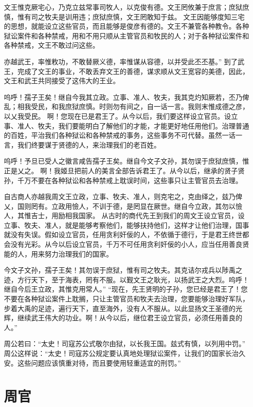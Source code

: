 \documentclass[12pt,UTF8]{ctexbook}
\begin{document}
文王惟克厥宅心，乃克立兹常事司牧人，以克俊有德。文王罔攸兼于庶言；庶狱庶慎，惟有司之牧夫是训用违；庶狱庶慎，文王罔敢知于兹。
文王因能够度知三宅的思想，就能设立这些官员，而且能够是俊彦有德的。文王不兼管各种教令。各种狱讼案件和各种禁戒，用和不用只顺从主管官员和牧民的人；对于各种狱讼案件和各种禁戒，文王不敢过问这些。

亦越武王，率惟敉功，不敢替厥义德，率惟谋从容德，以并受此丕丕基。”
到了武王，完成了文王的事业，不敢丢弃文王的善德，谋求顺从文王宽容的美德，因此，文王和武王共同接受了这伟大的王业。

呜呼！孺子王矣！继自今我其立政。立事、准人、牧夫，我其克灼知厥若，丕乃俾乱；相我受民，和我庶狱庶慎。时则勿有间之，自一话一言。我则末惟成德之彦，以乂我受民。
啊！您现在已是君王了。从今以后，我们要这样设立官员。设立事、准人、牧夫，我们要能明白了解他们的才能，才能更好地任用他们。治理普通的百姓，平治我们各种狱讼和各种禁戒的事务，这些事务不可代替。虽然一话一言，我们终要谋于贤德的人，来治理我们的老百姓。

呜呼！予旦已受人之徽言咸告孺子王矣。继自今文子文孙，其勿误于庶狱庶慎，惟正是乂之。
啊！我姬旦把前人的美言全部告诉君王了。从今以后，继承的贤子贤孙，千万不要在各种狱讼和各种禁戒上耽误时间，这些事只让主管官员去治理。

自古商人亦越我周文王立政，立事、牧夫、准人，则克宅之，克由绎之，兹乃俾乂，国则罔有。立政用憸人，不训于德，是罔显在厥世。继自今立政，其勿以憸人，其惟吉士，用励相我国家。
从古时的商代先王到我们的周文王设立官员，设立事、牧夫、准人，就是能够考察他们，能够扶持他们，这样才让他们治理，国事就没有失误。假如设立官员，任用贪利奸佞的人，不依循于德行，于是君王终世都会没有光彩。从今以后设立官员，千万不可任用贪利奸佞的小人，应当任用善良贤能的人，用来努力治理我们的国家。

今文子文孙，孺子王矣！其勿误于庶狱，惟有司之牧夫。其克诘尔戎兵以陟禹之迹，方行天下，至于海表，罔有不服。以觐文王之耿光，以扬武王之大烈。呜呼！继自今后王立政，其惟克用常人。”
“现在，先王贤明的子孙，您已经是君王了！您不要在各种狱讼案件上耽搁，只让主管官员和牧夫去治理，您要能够治理好军队，步着大禹的足迹，遍行天下，直至海外，没有人不服从。以此显扬文王圣德的光辉，继续武王伟大的功业。啊！从今以后，继位君王设立官员，必须任用善良的人。”

周公若曰：“太史！司寇苏公式敬尔由狱，以长我王国。兹式有慎，以列用中罚。”
周公这样说：“太史！司寇苏公规定要认真地处理狱讼案件，让我们的国家长治久安。这些问题应该慎重对待，而且要使用轻重适宜的刑罚。”

\chapter{周官}
\end{document}
